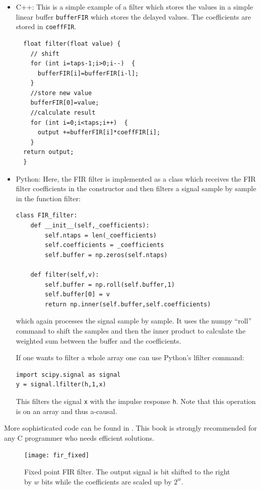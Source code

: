 \documentclass[12pt,a4paper]{article}
\begin{document}
\begin{itemize}
\item C++:
This is a simple example of a filter which stores the values
in a simple linear buffer \texttt{bufferFIR} which stores the
delayed values. The coefficients are stored in \texttt{coeffFIR}.
\begin{verbatim}
  float filter(float value) {
    // shift
    for (int i=taps-1;i>0;i--)  {
      bufferFIR[i]=bufferFIR[i-l];
    }
    //store new value
    bufferFIR[0]=value;
    //calculate result
    for (int i=0;i<taps;i++)  {
      output +=bufferFIR[i]*coeffFIR[i];
    }
  return output;
  }
\end{verbatim}

\item Python: Here, the FIR filter is implemented as a
  class which receives the FIR filter coefficients
  in the constructor and then filters a signal sample
  by sample in the function filter:
  
\begin{verbatim}
class FIR_filter:
    def __init__(self,_coefficients):
        self.ntaps = len(_coefficients)
        self.coefficients = _coefficients
        self.buffer = np.zeros(self.ntaps)

    def filter(self,v):
        self.buffer = np.roll(self.buffer,1)
        self.buffer[0] = v
        return np.inner(self.buffer,self.coefficients)
\end{verbatim}
which again processes the signal sample by sample. It uses
the numpy ``roll'' command to shift the samples and then
the inner product to calculate the weighted sum between
the buffer and the coefficients.

If one wants
to filter a whole array one can use Python's lfilter command:
\begin{verbatim}
import scipy.signal as signal
y = signal.lfilter(h,1,x)
\end{verbatim}
This filters the signal \texttt{x} with the impulse response
\texttt{h}. Note that this operation is on an array and thus
a-causal.
\end{itemize}
More sophisticated code can be found in \citet{NumericalRec2007}.
This book is strongly recommended for any C programmer who
needs efficient solutions.


\begin{figure}[!hbt]
\begin{center}
\mbox{\texttt{[image: fir\_fixed]}}
\caption{Fixed point FIR filter. The output signal is bit shifted to the
  right by $w$ bits while the coefficients are scaled up by $2^w$. \label{fir_fixed}}
\end{center}
\end{figure}
\end{document}
